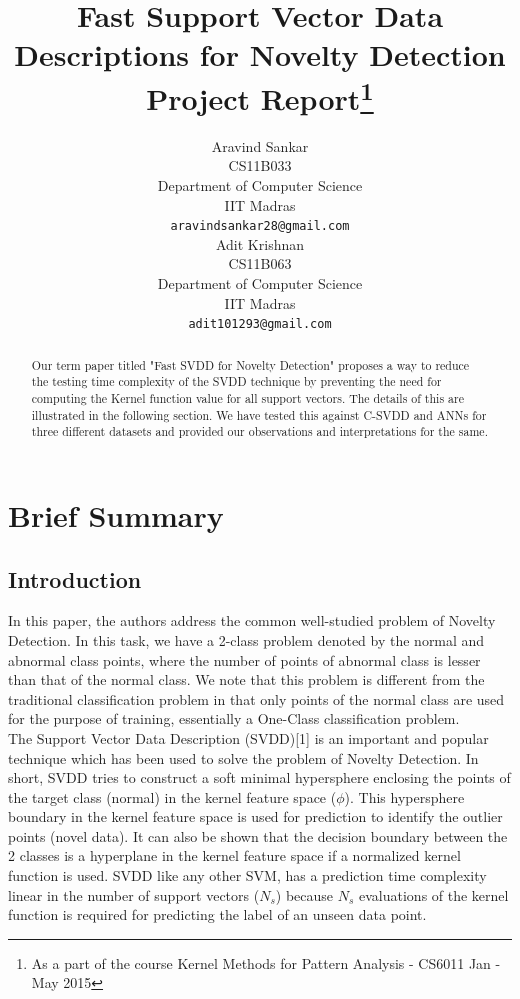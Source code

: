 \documentclass{article} %
\title{Fast Support Vector Data Descriptions for Novelty Detection\\ Project Report\thanks{As a part of the course Kernel Methods for Pattern Analysis - CS6011 Jan - May 2015}}
\author{
Aravind Sankar \\
CS11B033 \\
Department of Computer Science\\
IIT Madras\\
\texttt{aravindsankar28@gmail.com} \\
\And
Adit Krishnan \\
CS11B063\\
Department of Computer Science\\
IIT Madras\\
\texttt{adit101293@gmail.com} \\
}
\begin{document}
\maketitle

\begin{abstract}
Our term paper titled "Fast SVDD for Novelty Detection" proposes a way to reduce the testing time complexity of the SVDD technique by preventing the need for computing the Kernel function value for all support vectors. The details of this are illustrated in the following section. We have tested this against C-SVDD and ANNs for three different datasets and provided our observations and interpretations for the same.
\end{abstract}




\section{Brief Summary}
\subsection{Introduction}

In this paper, the authors address the common well-studied problem of Novelty Detection. In this task, we have a 2-class problem denoted by the normal and abnormal class points, where the number of points of abnormal class is lesser than that of the normal class. We note that this problem is different from the traditional classification problem in that only points of the normal class are used for the purpose of training, essentially a One-Class classification problem.  \\[10pt]

The Support Vector Data Description (SVDD)[1]  is an important and popular technique which has been used to solve the problem of Novelty Detection. In short, SVDD tries to construct a soft minimal hypersphere enclosing the points of the target class (normal) in the kernel feature space ($\phi$). This hypersphere boundary in the kernel feature space is used for prediction to identify the outlier points (novel data). It can also be shown that the decision boundary between the 2 classes is a hyperplane in the kernel feature space if a normalized kernel function is used. SVDD like any other SVM, has a prediction time complexity linear in the number of support vectors ($N_s$) because $N_s$ evaluations of the kernel function is required for predicting the label of an unseen data point. \\[10pt]
\end{document}
